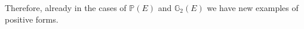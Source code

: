 \documentclass[a4paper]{amsart}
\theoremstyle{plain}%
\theoremstyle{definition}
\theoremstyle{remark}
\newcommand{\PP}{\mathbb{P}}
\newcommand{\GG}{\mathbb{G}}
\begin{document}
Therefore, already in the cases of $ \PP(E) $ and $ \GG_{2}(E) $ we have new examples of positive forms.



{}
\end{document}
